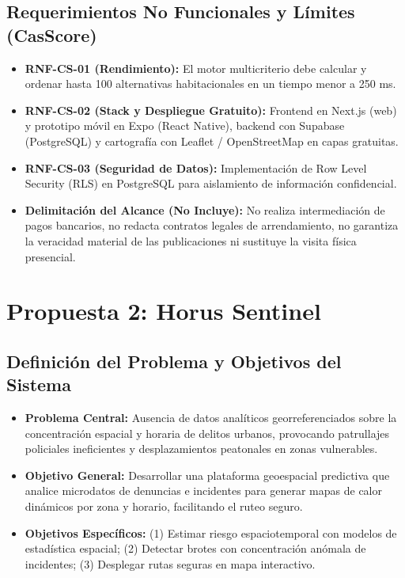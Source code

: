 \documentclass[11pt,a4paper]{article}
\begin{document}
\subsection{Requerimientos No Funcionales y Límites (CasScore)}
\begin{itemize}[leftmargin=*]
    \item \textbf{RNF-CS-01 (Rendimiento):} El motor multicriterio debe calcular y ordenar hasta 100 alternativas habitacionales en un tiempo menor a 250 ms.
    \item \textbf{RNF-CS-02 (Stack y Despliegue Gratuito):} Frontend en Next.js (web) y prototipo móvil en Expo (React Native), backend con Supabase (PostgreSQL) y cartografía con Leaflet / OpenStreetMap en capas gratuitas.
    \item \textbf{RNF-CS-03 (Seguridad de Datos):} Implementación de Row Level Security (RLS) en PostgreSQL para aislamiento de información confidencial.
    \item \textbf{Delimitación del Alcance (No Incluye):} No realiza intermediación de pagos bancarios, no redacta contratos legales de arrendamiento, no garantiza la veracidad material de las publicaciones ni sustituye la visita física presencial.
\end{itemize}

\vspace{0.2cm}

\section{Propuesta 2: Horus Sentinel}

\subsection{Definición del Problema y Objetivos del Sistema}
\begin{itemize}[leftmargin=*]
    \item \textbf{Problema Central:} Ausencia de datos analíticos georreferenciados sobre la concentración espacial y horaria de delitos urbanos, provocando patrullajes policiales ineficientes y desplazamientos peatonales en zonas vulnerables.
    \item \textbf{Objetivo General:} Desarrollar una plataforma geoespacial predictiva que analice microdatos de denuncias e incidentes para generar mapas de calor dinámicos por zona y horario, facilitando el ruteo seguro.
    \item \textbf{Objetivos Específicos:} (1) Estimar riesgo espaciotemporal con modelos de estadística espacial; (2) Detectar brotes con concentración anómala de incidentes; (3) Desplegar rutas seguras en mapa interactivo.
\end{itemize}
\end{document}

